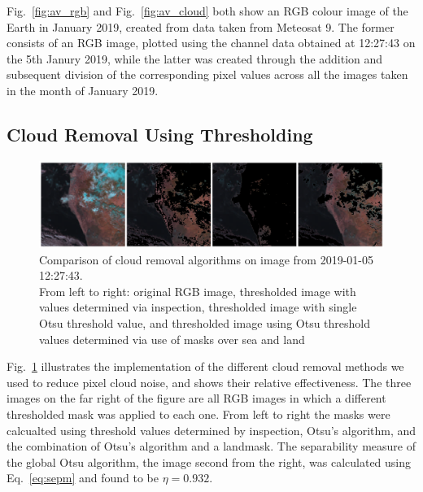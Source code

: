 Fig.~\ref{fig:av_rgb} and Fig.~\ref{fig:av_cloud} both show an RGB colour image of the Earth in January 2019, created from data taken from Meteosat 9. The former consists of an RGB image, plotted using the channel data obtained at 12:27:43 on the 5th Janury 2019, while the latter was created through the addition and subsequent division of the corresponding pixel values across all the images taken in the month of January 2019. 


\subsection{Cloud Removal Using Thresholding}
\begin{figure}[hbt!]
    \centering
    \includegraphics[width=1\textwidth]{compare_removal.png}
    \caption{Comparison of cloud removal algorithms on image from 2019-01-05 12:27:43.
    \\From left to right: original RGB image, thresholded image with values determined via inspection, thresholded image with single Otsu threshold value, and thresholded image using Otsu threshold values determined via use of masks over sea and land}
    \label{fig:iterav}
\end{figure}


Fig.~\ref{fig:iterav} illustrates the implementation of the different cloud removal methods we used to reduce pixel cloud noise, and shows their relative effectiveness. The three images on the far right of the figure are all RGB images in which a different thresholded mask was applied to each one. From left to right the masks were calcualted using threshold values determined by inspection, Otsu's algorithm, and the combination of Otsu's algorithm and a landmask. The separability measure of the global Otsu algorithm, the image second from the right, was calculated using Eq.~\ref{eq:sepm} and found to be $\eta = 0.932$.

